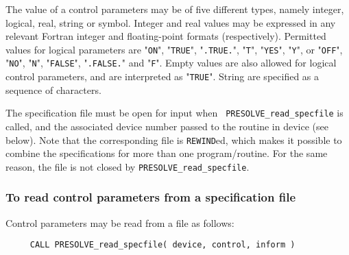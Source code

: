 \documentclass{galahad}
\newcommand{\packagename}{PRESOLVE}
\newcommand{\sym}{\tt\small}
\begin{document}
The value of a control parameters may be of five different types, namely
integer, logical, real, string or symbol.
Integer and real values may be expressed in any relevant Fortran integer and
floating-point formats (respectively). Permitted values for logical
parameters are "{\tt ON}", "{\tt TRUE}", "{\tt .TRUE.}", "{\tt T}",
"{\tt YES}", "{\tt Y}", or "{\tt OFF}", "{\tt NO}",
"{\tt N}", "{\tt FALSE}", "{\tt .FALSE.}" and "{\tt F}".
Empty values are also allowed for logical control parameters, and are
interpreted as "{\tt TRUE}". String are specified as a sequence of characters.

The specification file must be open for input when {\tt
\packagename\_read\_specfile} is called, and the associated device number
passed to the routine in device (see below).  Note that the corresponding
file is {\tt REWIND}ed, which makes it possible to combine the specifications
for more than one program/routine.  For the same reason, the file is not
closed by {\tt \packagename\_read\_specfile}.

\subsubsection{To read control parameters from a specification file}
\label{readspec}

Control parameters may be read from a file as follows:
\hskip0.5in
\def\baselinestretch{0.8} {\tt \begin{verbatim}
     CALL PRESOLVE_read_specfile( device, control, inform )
\end{verbatim}}
\def\baselinestretch{1.0}
\end{document}
